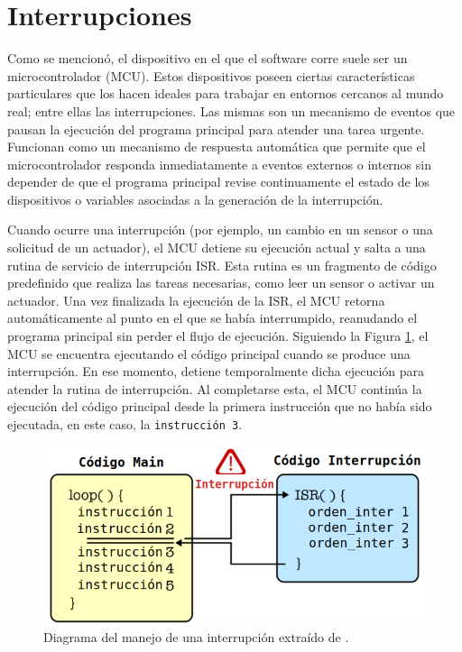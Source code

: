\section{Interrupciones}
\label{secInterrupciones}
Como se mencionó, el dispositivo en el que el software corre suele ser un microcontrolador (\gls{MCU}). Estos dispositivos poseen ciertas características particulares que los hacen ideales para trabajar en entornos cercanos al mundo real; entre ellas las interrupciones. Las mismas son un mecanismo de eventos que pausan la ejecución del programa principal para atender una tarea urgente. Funcionan como un mecanismo de respuesta automática que permite que el microcontrolador responda inmediatamente a eventos externos o internos sin depender de que el programa principal revise continuamente el estado de los dispositivos o variables asociadas a la generación de la interrupción.

Cuando ocurre una interrupción (por ejemplo, un cambio en un sensor o una solicitud de un actuador), el \gls{MCU} detiene su ejecución actual y salta a una rutina de servicio de interrupción \gls{ISR}. Esta rutina es un fragmento de código predefinido que realiza las tareas necesarias, como leer un sensor o activar un actuador. Una vez finalizada la ejecución de la \gls{ISR}, el \gls{MCU} retorna automáticamente al punto en el que se había interrumpido, reanudando el programa principal sin perder el flujo de ejecución. Siguiendo la Figura \ref{interrupt}, el \gls{MCU} se encuentra ejecutando el código principal cuando se produce una interrupción. En ese momento, detiene temporalmente dicha ejecución para atender la rutina de interrupción. Al completarse esta, el \gls{MCU} continúa la ejecución del código principal desde la primera instrucción que no había sido ejecutada, en este caso, la \verb|instrucción 3|.

\begin{figure}[H]
	\centering
    \includegraphics[width=0.65\linewidth]{components_interrupt.png}
    \caption{Diagrama del manejo de una interrupción extraído de \cite{imgInterrupciones}.}
    \label{interrupt}
\end{figure}


